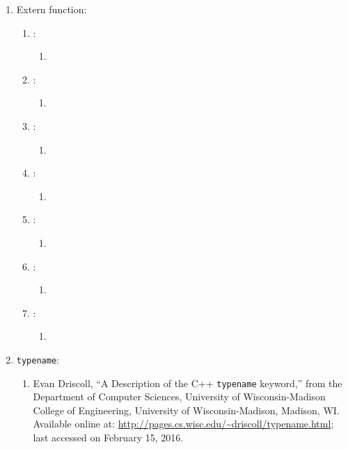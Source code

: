 \begin{enumerate}
\begin{enumerate}
	\end{enumerate}
\item Extern function: \vspace{-0.3cm}
	\begin{enumerate} \itemsep -2pt
	\item : \vspace{-0.2cm}
		\begin{enumerate} \itemsep -2pt
		\item 
		\end{enumerate}
	\item : \vspace{-0.2cm}
		\begin{enumerate} \itemsep -2pt
		\item 
		\end{enumerate}
	\item : \vspace{-0.2cm}
		\begin{enumerate} \itemsep -2pt
		\item 
		\end{enumerate}
	\item : \vspace{-0.2cm}
		\begin{enumerate} \itemsep -2pt
		\item 
		\end{enumerate}
	\item : \vspace{-0.2cm}
		\begin{enumerate} \itemsep -2pt
		\item 
		\end{enumerate}
	\item : \vspace{-0.2cm}
		\begin{enumerate} \itemsep -2pt
		\item 
		\end{enumerate}
	\item : \vspace{-0.2cm}
		\begin{enumerate} \itemsep -2pt
		\item 
		\end{enumerate}
	\end{enumerate}
\item {\tt typename}: \vspace{-0.3cm}
	\begin{enumerate} \itemsep -2pt
	\item Evan Driscoll, ``A Description of the C++ {\tt typename} keyword,'' from the Department of Computer Sciences, University of Wisconsin-Madison College of Engineering, University of Wisconsin-Madison, Madison, WI. Available online at: \url{http://pages.cs.wisc.edu/~driscoll/typename.html}; last accessed on February 15, 2016.

\end{enumerate}
\end{enumerate}
